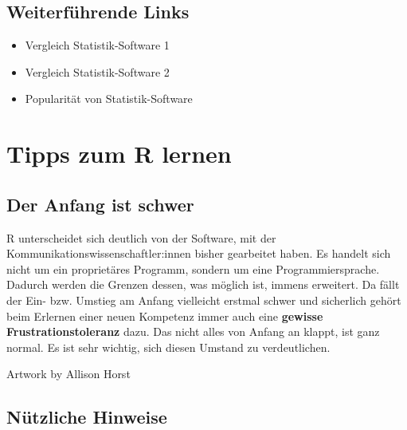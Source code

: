 \documentclass[
]{book}
\providecommand{\tightlist}{%
  \setlength{\itemsep}{0pt}\setlength{\parskip}{0pt}}
\begin{document}
\hypertarget{weiterfuxfchrende-links-1}{%
\subsection*{Weiterführende Links}\label{weiterfuxfchrende-links-1}}

\begin{itemize}
\tightlist
\item
  Vergleich Statistik-Software 1
\item
  Vergleich Statistik-Software 2
\item
  Popularität von Statistik-Software
\end{itemize}

\hypertarget{tipps-zum-r-lernen}{%
\section{Tipps zum R lernen}\label{tipps-zum-r-lernen}}

\hypertarget{der-anfang-ist-schwer}{%
\subsection{Der Anfang ist schwer}\label{der-anfang-ist-schwer}}

R unterscheidet sich deutlich von der Software, mit der Kommunikationswissenschaftler:innen bisher gearbeitet haben. Es handelt sich nicht um ein proprietäres Programm, sondern um eine Programmiersprache. Dadurch werden die Grenzen dessen, was möglich ist, immens erweitert. Da fällt der Ein- bzw. Umstieg am Anfang vielleicht erstmal schwer und sicherlich gehört beim Erlernen einer neuen Kompetenz immer auch eine \textbf{gewisse Frustrationstoleranz} dazu. Das nicht alles von Anfang an klappt, ist ganz normal. Es ist sehr wichtig, sich diesen Umstand zu verdeutlichen.

Artwork by Allison Horst

\hypertarget{nuxfctzliche-hinweise}{%
\subsection{Nützliche Hinweise}\label{nuxfctzliche-hinweise}}
\end{document}
